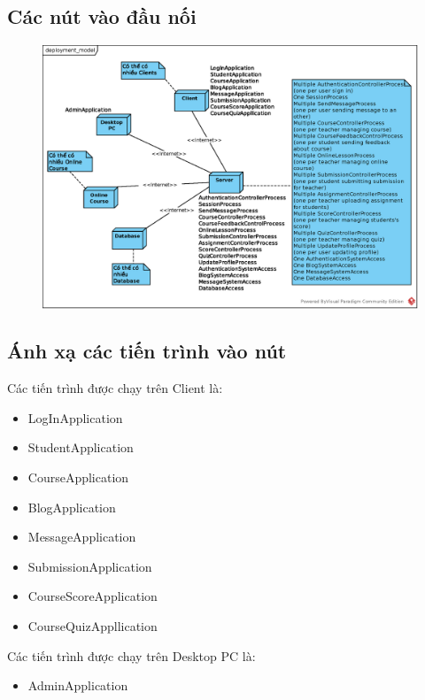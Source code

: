 \documentclass[./../main.tex]{subfiles}
\begin{document}
	\subsection{Các nút vào đầu nối}
	\begin{figure}[H]
		\centering
		\includegraphics[width=\linewidth]{./images/deployment_model.eps}
	\end{figure}
	\subsection{Ánh xạ các tiến trình vào nút}
	Các tiến trình được chạy trên Client là:
	\begin{itemize}
	\item LogInApplication
	\item StudentApplication
	\item CourseApplication
	\item BlogApplication
	\item MessageApplication
	\item SubmissionApplication
	\item CourseScoreApplication
	\item CourseQuizAppllication
	\end{itemize}     
	Các tiến trình được chạy trên Desktop PC là:
	\begin{itemize}
		\item AdminApplication
	\end{itemize}
\end{document}
